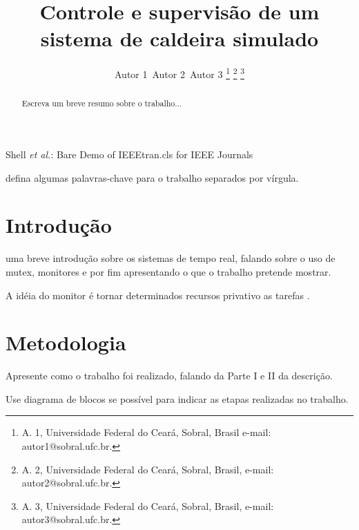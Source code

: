 \documentclass[journal]{IEEEtran}
\begin{document}
	
\title{Controle e supervisão de um sistema de caldeira simulado}

\author{Autor 1~Autor 2~Autor 3%
\thanks{A. 1, Universidade Federal do Ceará, Sobral, Brasil e-mail: autor1@sobral.ufc.br.}%
\thanks{A. 2, Universidade Federal do Ceará, Sobral, Brasil, e-mail: autor2@sobral.ufc.br.}%
\thanks{A. 3, Universidade Federal do Ceará, Sobral, Brasil, e-mail: autor3@sobral.ufc.br.}%
}

%
{Shell \MakeLowercase{\textit{et al.}}: Bare Demo of IEEEtran.cls for IEEE Journals}


\maketitle

\begin{abstract}
Escreva um breve resumo sobre o trabalho...
\end{abstract}

\begin{IEEEkeywords}
defina algumas palavras-chave para o trabalho separados por vírgula.
\end{IEEEkeywords}

\IEEEpeerreviewmaketitle

\section{Introdução}

 uma breve introdução sobre os sistemas de tempo real, falando sobre o uso de mutex, monitores e por fim apresentando o que o trabalho pretende mostrar.

A idéia do monitor é tornar determinados recursos privativo as tarefas \cite{IEEEhowto:romulo}.
\section{Metodologia}

Apresente como o trabalho foi realizado, falando da Parte I e II da descrição. 

Use diagrama de blocos se possível para indicar as etapas realizadas no trabalho.
\end{document}

